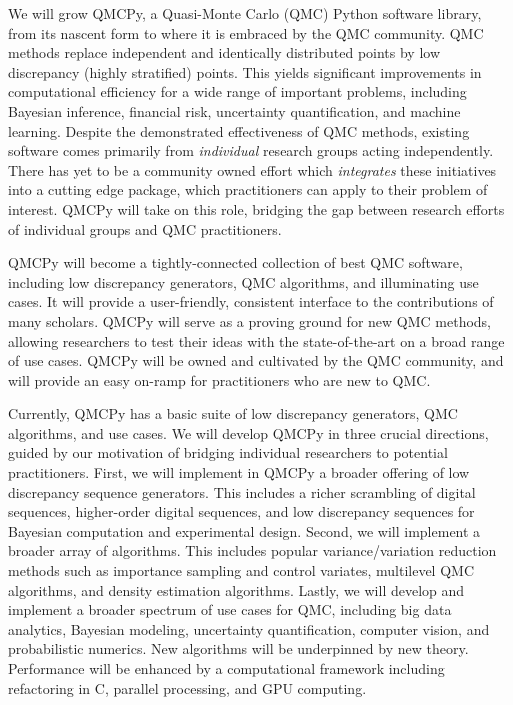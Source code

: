 \documentclass[11pt]{article}%
\begin{document}

\noindent We will grow QMCPy, a Quasi-Monte Carlo (QMC) Python software library, from its nascent form to where it is embraced by the QMC community. QMC methods replace independent and identically distributed points by low discrepancy (highly stratified) points.  This yields significant improvements in computational efficiency for a wide range of important problems, including Bayesian inference, financial risk, uncertainty quantification, and machine learning. Despite the demonstrated effectiveness of QMC methods, existing software comes primarily from \textit{individual} research groups acting independently. There has yet to be a community owned effort which \textit{integrates} these initiatives into a cutting edge package, which practitioners can apply to their problem of interest. QMCPy will take on this role, bridging the gap between research efforts of individual groups and QMC practitioners.

QMCPy will become a tightly-connected collection of best QMC software, including low discrepancy generators, QMC algorithms, and illuminating use cases. It will provide a user-friendly, consistent interface to the contributions of many scholars. QMCPy will serve as a proving ground for new QMC methods, allowing researchers to test their ideas with the state-of-the-art on a broad range of use cases. QMCPy will be owned and cultivated by the QMC community, and will provide an easy on-ramp for practitioners who are new to QMC.

\bigskip


\noindent Currently, QMCPy has a basic suite of low discrepancy generators, QMC algorithms,  and use cases. We will develop QMCPy in three crucial directions, guided by our motivation of bridging individual researchers to potential practitioners. First, we will implement in QMCPy a broader offering of low discrepancy sequence generators.  This includes a richer scrambling of digital sequences, higher-order digital sequences, and low discrepancy sequences for Bayesian computation and experimental design. Second, we will implement a broader array of algorithms. This includes popular variance/variation reduction methods such as importance sampling and control variates, multilevel QMC algorithms, and density estimation algorithms. Lastly, we will develop and implement a broader spectrum of use cases for QMC, including big data analytics, Bayesian modeling, uncertainty quantification, computer vision, and probabilistic numerics. New algorithms will be underpinned by new theory.  Performance will be enhanced by a computational framework including refactoring in C, parallel processing, and GPU computing.
\end{document}
